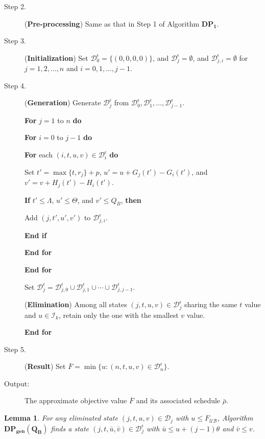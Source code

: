 \documentclass[12pt]{article}
\newtheorem{lemma}{Lemma}[section]
\begin{document}
\begin{sloppypar}
\begin{description}
\item [Step 2.] (\textbf{Pre-processing}) Same as that in Step 1 of Algorithm $\mathbf{DP_1}$.

\item [Step 3.] (\textbf{Initialization}) Set $\mathcal{D}_0^{\epsilon}=\{(0,0,0,0)\}$, and ${\mathcal D}_j^{\epsilon}=\emptyset$, and $\mathcal{D}_{j,i}^{\epsilon}=\emptyset$ for $j=1, 2, \ldots, n$ and $i=0, 1, \ldots, j-1$.

\item [Step 4.] (\textbf{Generation}) Generate ${\mathcal D}_j^{\epsilon}$ from ${\mathcal D}_0^{\epsilon}, {\mathcal D}_1^{\epsilon}, \ldots, {\mathcal D}_{j-1}^{\epsilon}$.

\textbf{For} $j=1$ to $n$ \textbf{do}

\quad \textbf{For} $i=0$ to $j-1$ \textbf{do}

\qquad \textbf{For} each $(i, t, u, v) \in \mathcal{D}_i^{\epsilon}$ \textbf{do}

\quad \qquad Set $t'=\max\{t, r_j\}+p$, $u'=u+G_j(t')-G_i(t')$, and $v'=v+H_j(t')-H_i(t')$.

\quad \qquad \textbf{If}  $t' \leq \Lambda$, $u' \leq \Theta$, and $v' \leq Q_B$, \textbf{then}

\quad \qquad \qquad Add $(j, t', u', v')$ to $\mathcal{D}_{j,i}^{\epsilon}$.

\quad \qquad \textbf{End if}

\qquad \textbf{End for}

\quad \textbf{End for}

\quad Set $\mathcal{D}_j^{\epsilon}=\mathcal{D}_{j,0}^{\epsilon} \cup \mathcal{D}_{j,1}^{\epsilon} \cup \cdots \cup \mathcal{D}_{j,j-1}^{\epsilon}$.

\quad (\textbf{Elimination})  Among all states $(j, t, u, v) \in \mathcal{D}_{j}^{\epsilon}$ sharing the same $t$ value and $u \in \mathcal{I}_k$, retain only the one with the smallest $v$ value.

\textbf{End for}

\item [Step 5.] (\textbf{Result}) Set $\overline{F}=\min\{u: (n, t, u, v) \in \mathcal{D}_n^{\epsilon}\}$.

\item [Output:] The approximate objective value $\overline{F}$ and its associated schedule $\bar{\rho}$.
\end{description}

\begin{lemma} \label{L-6.1}
For any eliminated state $(j, t, u, v) \in \mathcal{D}_j$ with $u \leq F_{\mathcal{UB}}$,
Algorithm $\mathbf{DP_{gen}(Q_B)}$ finds a state
$(j, t, \bar{u}, \bar{v}) \in \mathcal{D}_j^{\epsilon}$ with $\bar{u} \leq u+(j-1) \theta$ and $\bar{v} \leq v$.
\end{lemma}


\end{sloppypar}
\end{document}
